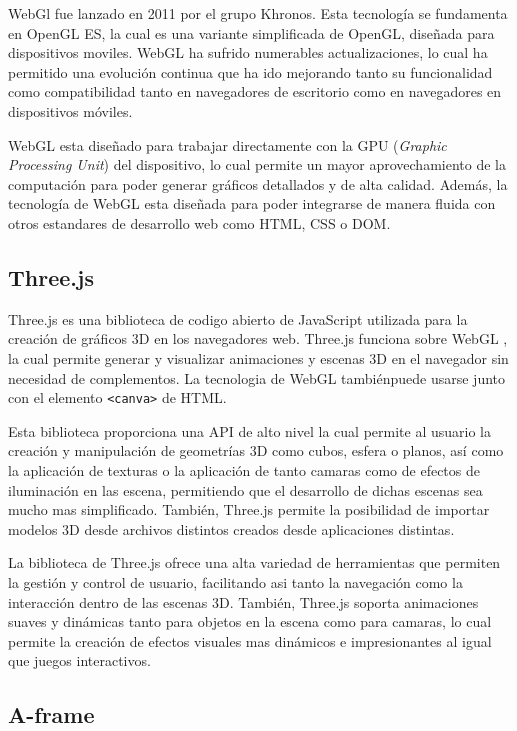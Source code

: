 \documentclass[a4paper, 12pt]{book}
\begin{document}
WebGl fue lanzado en 2011 por el grupo Khronos. Esta tecnología se fundamenta en OpenGL ES, la cual es una variante simplificada de OpenGL, diseñada para dispositivos moviles. WebGL ha sufrido numerables actualizaciones, 
lo cual ha permitido una evolución continua que ha ido mejorando tanto su funcionalidad como compatibilidad tanto en navegadores de escritorio como en navegadores en dispositivos móviles. 

WebGL esta diseñado para trabajar directamente con la GPU (\textit{Graphic Processing Unit}) del dispositivo, lo cual permite un mayor aprovechamiento de la computación para poder generar gráficos detallados y de alta calidad. 
Además, la tecnología de WebGL esta diseñada para poder integrarse de manera fluida con otros estandares de desarrollo web como HTML, CSS o DOM. 

\subsection{Three.js}
\label{subsec:Three.js}

Three.js \cite{threejs_wikipedia} es una biblioteca de codigo abierto de JavaScript utilizada para la creación de gráficos 3D en los navegadores web. Three.js funciona sobre WebGL \cite{webgl_encodebiz}, la cual permite generar y visualizar animaciones y escenas 3D en el navegador sin necesidad de complementos. La tecnologia de WebGL tambiénpuede usarse junto con el elemento \texttt{<canva>} de HTML.

Esta biblioteca proporciona una API de alto nivel la cual permite al usuario la creación y manipulación de geometrías 3D como cubos, esfera o planos, así como la aplicación de texturas o la aplicación de tanto camaras como de efectos de iluminación en las escena, permitiendo que el desarrollo de dichas escenas sea mucho mas simplificado. 
También, Three.js permite la posibilidad de importar modelos 3D desde archivos distintos creados desde aplicaciones distintas.

La biblioteca de Three.js ofrece una alta variedad de herramientas que permiten la gestión y control de usuario, facilitando asi tanto la navegación como la interacción dentro de las escenas 3D. También, Three.js soporta animaciones suaves y dinámicas tanto para objetos en la escena como para camaras, lo cual permite la creación de efectos visuales mas dinámicos e impresionantes al igual que juegos interactivos. 


\subsection{A-frame}
\label{subsec: Aframe}
\end{document}
